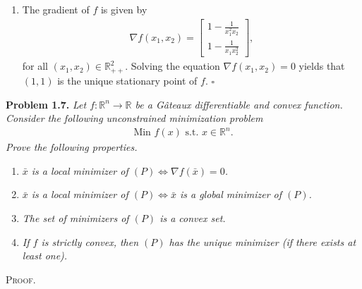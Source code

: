 \documentclass[a4paper]{article}
\numberwithin{equation}{section}
\begin{document}
\begin{enumerate}
\begin{align}
{\begin{array}{*{20}{c}}
{\left( {{x_3}{x_1} - {x_1}{x_2}{x_3}} \right){e^{ - {x_1} - {x_2} - {x_3}}}}\\
{\left( {{x_1}{x_2} - {x_1}{x_2}{x_3}} \right){e^{ - {x_1} - {x_2} - {x_3}}}}
\end{array}} \right], 
\end{align}
for all $\left(x_1,x_2,x_3\right) \in \mathbb{R}^3$. Solving the equation $\nabla f\left( {{x_1},{x_2},{x_3}} \right) = \mathbf{0}$ yields that $\left(1,1,1\right)$, $\left(a,0,0\right)$, for arbitrary $a\in \mathbb{R}$ and its permutations are the only stationary points of $f$. 
\item The gradient of $f$ is given by
\begin{align}
\nabla f\left( {{x_1},{x_2}} \right) = \left[ {\begin{array}{*{20}{c}}
{1 - \frac{1}{{x_1^2{x_2}}}}\\
{1 - \frac{1}{{{x_1}x_2^2}}}
\end{array}} \right],
\end{align}
for all $\left(x_1,x_2\right) \in \mathbb{R}_{++}^2$. Solving the equation $\nabla f\left( {{x_1},{x_2}} \right) = 0$ yields that $\left(1,1\right)$ is the unique stationary point of $f$. \hfill $\square$
\end{enumerate}
\textbf{Problem 1.7.} \textit{Let $f: \mathbb{R}^n\to \mathbb{R}$ be a G\^{a}teaux differentiable and convex function. Consider the following unconstrained minimization problem}
\begin{align}
\mbox{Min }f\left( x \right) \mbox{ s.t. }x \in {\mathbb{R}^n}.
\end{align}
\textit{Prove the following properties.}
\begin{enumerate}
\item \textit{$\bar x$ is a local minimizer of $\left( P \right) \Leftrightarrow \nabla f\left( {\bar x} \right) = 0$.}
\item \textit{$\bar x$ is a local minimizer of $\left( P \right) \Leftrightarrow \bar x$ is a global minimizer of $\left(P\right)$.}
\item \textit{The set of minimizers of $\left(P\right)$ is a convex set.}
\item \textit{If $f$ is strictly convex, then $\left(P\right)$ has the unique minimizer (if there exists at least one).}
\end{enumerate}
\textsc{Proof.}
\end{document}
